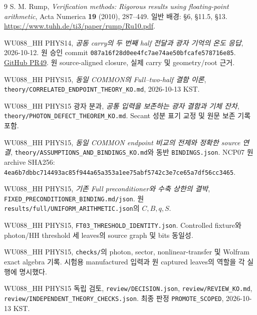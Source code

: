 \begingroup
\small
\setlength{\parskip}{0pt}
\begin{thebibliography}{9}
\setlength{\itemsep}{4pt}
S. M. Rump, \emph{Verification methods: Rigorous results using floating-point arithmetic},
Acta Numerica \textbf{19} (2010), 287--449.
일반 배경: \S6, \S11.5, \S13.
\url{https://www.tuhh.de/ti3/paper/rump/Ru10.pdf}.

WU088\_HH PHYS14, \emph{공동 carry의 두 번째 half 전달과 광자 기억의 온도 응답},
2026-10-12. 원 승인 commit
\texttt{087a16f28d0ee4fc7ae74ae50bfcafe578716e85}.
\href{https://github.com/cosmosapjw-quantum/WU088_HH/pull/49}{GitHub PR49}.
원 source-aligned closure, 실제 carry 및 geometry/root 근거.

WU088\_HH PHYS15, \emph{동일 COMMON의 Full--two-half 결함 이론},
\texttt{theory/CORRELATED\_ENDPOINT\_THEORY\_KO.md}, 2026-10-13 KST.

WU088\_HH PHYS15 광자 분과, \emph{공통 입력을 보존하는 광자 결함과 기체 잔차},
\texttt{theory/PHOTON\_DEFECT\_THEOREM\_KO.md}.
Secant 성분 표기 교정 및 원문 보존 기록 포함.

WU088\_HH PHYS15, \emph{동일 COMMON endpoint 비교의 전제와 정확한 source 연결},
\texttt{theory/ASSUMPTIONS\_AND\_BINDINGS\_KO.md}와 동반
\texttt{BINDINGS.json}. NCP07 원 archive SHA256:
\texttt{4ea6b7dbbc714493ac85f944a65a353a1ee75abf5742c3e7ce65a7df56cc3465}.

WU088\_HH PHYS15, \emph{기존 Full preconditioner와 수축 상한의 결박},
\texttt{FIXED\_PRECONDITIONER\_BINDING.md/json}.
원 \texttt{results/full/UNIFORM\_ARITHMETIC.json}의 $C,B,q,S$.

WU088\_HH PHYS15, \texttt{FT03\_THRESHOLD\_IDENTITY.json}.
Controlled fixture와 photon/HH threshold 세 leaves의 source graph 및 bits 동일성.

WU088\_HH PHYS15, \texttt{checks/}의 photon, sector, nonlinear-transfer 및
Wolfram exact algebra 기록. 시험용 manufactured 입력과 원 captured leaves의 역할을 각 실행에 명시했다.

WU088\_HH PHYS15 독립 검토,
\texttt{review/DECISION.json}, \texttt{review/REVIEW\_KO.md},
\texttt{review/INDEPENDENT\_THEORY\_CHECKS.json}.
최종 판정 \texttt{PROMOTE\_SCOPED}, 2026-10-13 KST.
\end{thebibliography}
\endgroup


